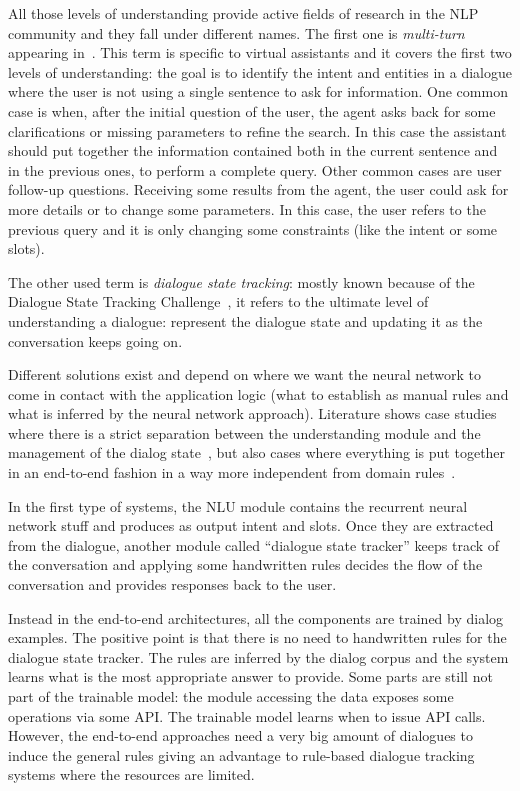 All those levels of understanding provide active fields of research in the NLP community and they fall under different names. The first one is \textit{multi-turn} appearing in~\cite{chen2016end,chen2017dynamic,xu2014contextual,bhargava2013easy,shi2015contextual}. This term is specific to virtual assistants and it covers the first two levels of understanding: the goal is to identify the intent and entities in a dialogue where the user is not using a single sentence to ask for information. One common case is when, after the initial question of the user, the agent asks back for some clarifications or missing parameters to refine the search. In this case the assistant should put together the information contained both in the current sentence and in the previous ones, to perform a complete query. Other common cases are user follow-up questions. Receiving some results from the agent, the user could ask for more details or to change some parameters. In this case, the user refers to the previous query and it is only changing some constraints (like the intent or some slots).

The other used term is \textit{dialogue state tracking}: mostly known because of the Dialogue State Tracking Challenge~\cite{williams2013dialog}, it refers to the ultimate level of understanding a dialogue: represent the dialogue state and updating it as the conversation keeps going on.

Different solutions exist and depend on where we want the neural network to come in contact with the application logic (what to establish as manual rules and what is inferred by the neural network approach). Literature shows case studies where there is a strict separation between the understanding module and the management of the dialog state~\cite{liu2016attention,chen2016end}, but also cases where everything is put together in an end-to-end fashion in a way more independent from domain rules~\cite{serban2016building,eric2017key}.

In the first type of systems, the NLU module contains the recurrent neural network stuff and produces as output intent and slots. Once they are extracted from the dialogue, another module called ``dialogue state tracker'' keeps track of the conversation and applying some handwritten rules decides the flow of the conversation and provides responses back to the user.

Instead in the end-to-end architectures, all the components are trained by dialog examples. The positive point is that there is no need to handwritten rules for the dialogue state tracker. The rules are inferred by the dialog corpus and the system learns what is the most appropriate answer to provide. Some parts are still not part of the trainable model: the module accessing the data exposes some operations via some API. The trainable model learns when to issue API calls. However, the end-to-end approaches need a very big amount of dialogues to induce the general rules giving an advantage to rule-based dialogue tracking systems where the resources are limited.

